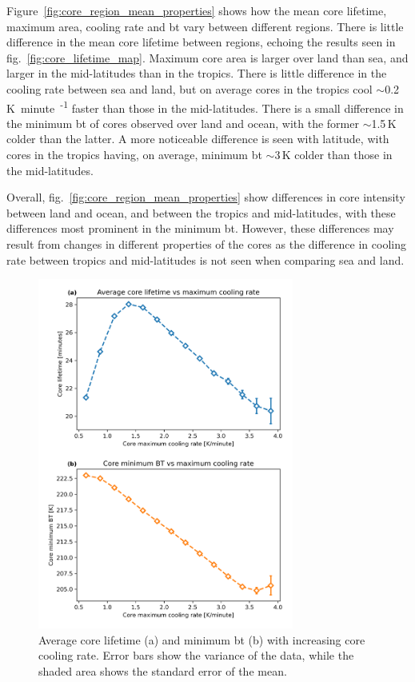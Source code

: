 Figure~\ref{fig:core_region_mean_properties} shows how the mean core lifetime, maximum area, cooling rate and \acrshort{bt} vary between different regions.
There is little difference in the mean core lifetime between regions, echoing the results seen in fig.~\ref{fig:core_lifetime_map}.
Maximum core area is larger over land than sea, and larger in the mid-latitudes than in the tropics.
There is little difference in the cooling rate between sea and land, but on average cores in the tropics cool $\sim$0.2\,\unit{K minute\textsuperscript{-1}} faster than those in the mid-latitudes.
There is a small difference in the minimum \acrshort{bt} of cores observed over land and ocean, with the former $\sim$1.5\,\unit{K} colder than the latter.
A more noticeable difference is seen with latitude, with cores in the tropics having, on average, minimum \acrshort{bt} $\sim$3\,\unit{K} colder than those in the mid-latitudes.

Overall, fig.~\ref{fig:core_region_mean_properties} show differences in core intensity between land and ocean, and between the tropics and mid-latitudes, with these differences most prominent in the minimum \acrshort{bt}.
However, these differences may result from changes in different properties of the cores as the difference in cooling rate between tropics and mid-latitudes is not seen when comparing sea and land.

\begin{figure}[tp]
    \centering
    \includegraphics[width=0.75\textwidth]{figures/chapter2_10.png}
    \caption[
    Average core lifetime and minimum \acrshort{bt} with increasing core cooling rate
    ]{
    Average core lifetime (a) and minimum \acrshort{bt} (b) with increasing core cooling rate. Error bars show the variance of the data, while the shaded area shows the standard error of the mean.
    }
    \label{fig:core_cooling_rate_relations}
\end{figure}



